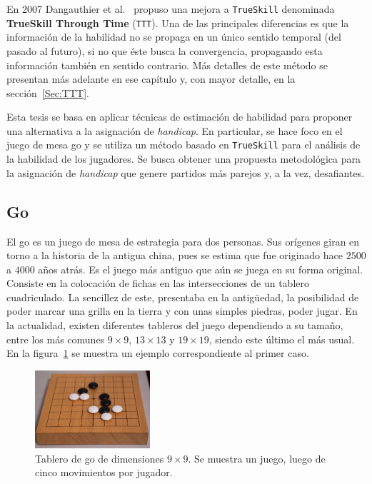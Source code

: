 \documentclass[11pt,twoside,spanish]{report} %
\begin{document}
En 2007 Dangauthier et al.~\cite{Dangauthier2007} propuso una mejora a \texttt{TrueSkill} denominada \textbf{TrueSkill Through Time} (\texttt{TTT}).
Una de las principales diferencias es que la informaci\'on de la habilidad no se propaga en un \'unico sentido temporal (del pasado al futuro), si no que \'este busca la convergencia, propagando esta informaci\'on tambi\'en en sentido contrario. 
M\'as detalles de este m\'etodo se presentan m\'as adelante en ese cap\'itulo y, con mayor detalle, en la secci\'on~\ref{Sec:TTT}.

\vspace{0.3cm}
\begin{mdframed}[backgroundcolor=frenchblue!20]
	Esta tesis se basa en aplicar t\'ecnicas de estimaci\'on de habilidad para proponer una alternativa a la asignaci\'on de \emph{handicap}. 
	En particular, se hace foco en el juego de mesa go y se utiliza un m\'etodo basado en \texttt{TrueSkill} para el an\'alisis de la habilidad de los jugadores.
	Se busca obtener una propuesta metodol\'ogica para la asignaci\'on de \emph{handicap} que genere partidos m\'as parejos y, a la vez, desafiantes.
\end{mdframed}


\subsection{Go}

El go es un juego de mesa de estrategia para dos personas.
Sus or\'igenes giran en torno a la historia de la antigua china, pues se estima que fue originado hace $2500$ a $4000$ a\~nos atr\'as.
Es el juego m\'as antiguo que a\'un se juega en su forma original.
Consiste en la colocaci\'on de fichas en las intersecciones de un tablero cuadriculado. %
La sencillez de este, presentaba  en la antig\"uedad, la posibilidad de poder marcar una grilla en la tierra y con unas simples piedras, poder jugar.
En la actualidad, existen diferentes tableros del juego dependiendo a su tama\~no, entre los m\'as comunes $9\times9$, $13\times13$ y $19\times19$, siendo este \'ultimo el m\'as usual. 
En la figura~\ref{fig:tablero} se muestra un ejemplo correspondiente al primer caso.

\begin{figure} %
	\includegraphics[width=0.38\textwidth]{../tablero.jpg}
	\caption{Tablero de go de dimensiones $9\times9$. Se muestra un juego, luego de cinco movimientos por jugador.}
	\label{fig:tablero}
\end{figure}
\end{document}
